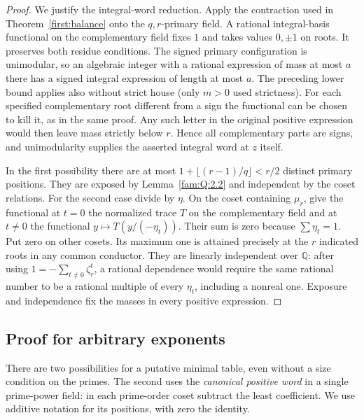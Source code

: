 \documentclass[11pt,a4paper]{article}
\numberwithin{equation}{section}
\theoremstyle{remark}
\newcommand{\QQ}{\mathbb Q}
\begin{document}
\begin{proof}
We justify the integral-word reduction. Apply the contraction used
in Theorem~\ref{first:balance} onto the $q,r$-primary field. A rational
integral-basis functional on the complementary field fixes $1$ and
takes values $0,\pm1$ on roots. It preserves both residue conditions.
The signed primary configuration is unimodular, so an algebraic
integer with a rational expression of mass at most $a$ there has a
signed integral expression of length at most $a$. The preceding
lower bound applies also without strict house (only $m>0$ used
strictness). For each specified complementary root different from a
sign the functional can be chosen to kill it, as in the same proof.
Any such letter in the original positive expression would then leave
mass strictly below $r$. Hence all complementary parts are signs,
and unimodularity supplies the asserted integral word at $z$ itself.

In the first possibility there are at most $1+\lfloor(r-1)/q\rfloor
<r/2$ distinct primary positions. They are exposed by Lemma~\ref{fam:Q:2.2} and independent by the coset relations. For the second case
divide by $\eta$. On the coset containing $\mu_r$, give the functional
at $t=0$ the normalized trace $T$ on the complementary field and at
$t\ne0$ the functional $y\mapsto T(y/(-\eta_t))$. Their sum is zero
because $\sum\eta_t=1$. Put zero on other cosets. Its maximum one is
attained precisely at the $r$ indicated roots in any common conductor.
They are linearly independent over $\QQ$: after using
$1=-\sum_{t\ne0}\zeta_r^t$, a rational dependence would require the
same rational number to be a rational multiple of every $\eta_t$,
including a nonreal one. Exposure and independence fix the masses
in every positive expression.
\end{proof}

\subsection{Proof for arbitrary exponents}\label{fam:Q:sec:3}
There are two possibilities for a putative minimal table, even
without a size condition on the primes. The second uses the
\emph{canonical positive word} in a single prime-power field:
in each prime-order coset subtract the least coefficient. We use
additive notation for its positions, with zero the identity.
\end{document}
